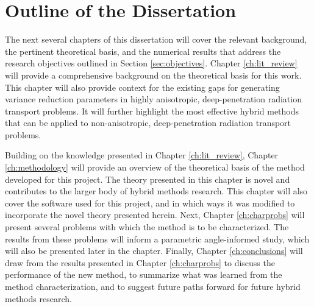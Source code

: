 \section{Outline of the Dissertation}
\label{sec:outline}

The next several chapters of this dissertation will cover the relevant
background, the pertinent theoretical basis, and the numerical results that
address the research objectives outlined in Section \ref{sec:objectives}.
Chapter \ref{ch:lit_review} will provide a
comprehensive background on the theoretical basis for this work. 
This chapter will also provide context for the existing gaps for
generating variance reduction parameters in
highly anisotropic, deep-penetration radiation transport problems. It will further
highlight the most effective hybrid methods that can be applied to
non-anisotropic, deep-penetration radiation transport problems. 

Building on
the knowledge presented in Chapter \ref{ch:lit_review},
Chapter \ref{ch:methodology} will provide an overview of the
theoretical basis of the method developed for this project. The theory
presented in this chapter is novel and contributes to the larger body of hybrid
methods research. This chapter will also cover the software used for this
project, and in which ways it was modified to incorporate the novel theory
presented herein. Next, Chapter \ref{ch:charprobs} will present several problems
with which the method is to be characterized. The results from these problems
will inform a parametric angle-informed study, which will also be presented
later in the chapter. Finally, Chapter \ref{ch:conclusions} will draw from the
results presented in Chapter \ref{ch:charprobs} to discuss the performance of
the new method, to summarize what was learned from the method characterization,
and to suggest future paths forward for future hybrid methods research.



